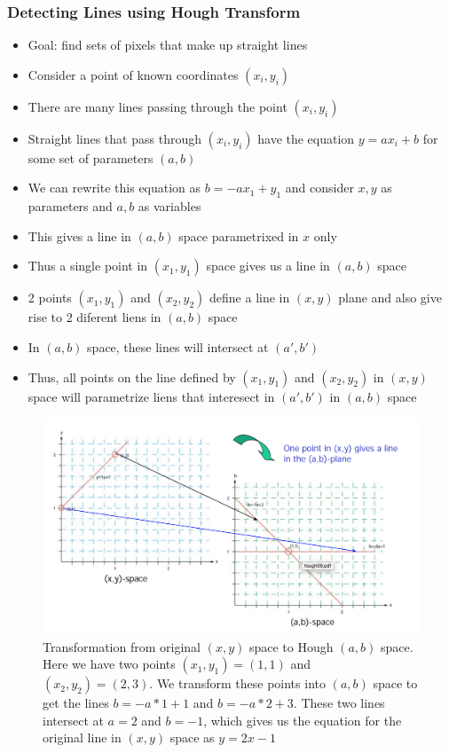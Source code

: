 \documentclass[letterpaper,12pt]{article}
\begin{document}
\subsubsection{Detecting Lines using Hough Transform}
\begin{itemize}
 \item Goal: find sets of pixels that make up straight lines
 \item Consider a point of known coordinates $(x_i,y_i)$
 \item There are many lines passing through the point $(x_i, y_i)$
 \item Straight lines that pass through $(x_i, y_i)$ have the equation $y = ax_i + b$ for some set of parameters $(a,b)$
 \item We can rewrite this equation as $b = -ax_1 + y_1$ and consider $x,y$ as parameters and $a,b$ as variables
 \item This gives a line in $(a,b)$ space parametrixed in $x$ only
 \item Thus a single point in $(x_1,y_1)$ space gives us a line in $(a,b)$ space
 \item 2 points $(x_1,y_1)$ and $(x_2,y_2)$ define a line in $(x,y)$ plane and also give rise to 2 diferent liens in $(a,b)$ space
 \item In $(a,b)$ space, these lines will intersect at $(a',b')$
 \item Thus, all points on the line defined by $(x_1,y_1)$ and $(x_2,y_2)$ in $(x,y)$ space will parametrize liens that interesect in $(a',b')$ in $(a,b)$ space
\end{itemize}
\begin{figure}[H]
 \centering
 \includegraphics[width=\textwidth]{images/hough_transform.png}
 \caption{Transformation from original $(x,y)$ space to Hough $(a,b)$ space. Here we have two points $(x_1,y_1)=(1,1)$ and $(x_2,y_2)=(2,3)$. We transform these points into $(a,b)$ space to get the lines $b=-a*1 +1$ and $b=-a*2+3$. These two lines intersect at $a=2$ and $b=-1$, which gives us the equation for the original line in $(x,y)$ space as $y=2x-1$}
\end{figure}
\end{document}
